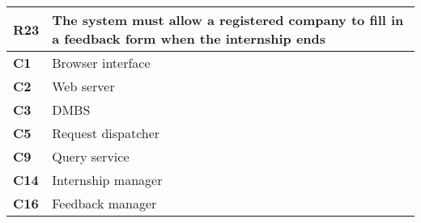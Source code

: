 \begin{table}[H]
    \centering
    \begin{tabular}{|l|m{10cm}|}
        \hline \textbf{R23} & The system must allow a registered company to fill in a feedback form when the internship ends \\
        \hline \textbf{C1} & Browser interface \\
        \hline \textbf{C2} & Web server \\
        \hline \textbf{C3} & DMBS \\
        \hline \textbf{C5} & Request dispatcher \\
        \hline \textbf{C9} & Query service \\
        \hline \textbf{C14} & Internship manager \\
        \hline \textbf{C16} & Feedback manager \\
        \hline
    \end{tabular}
\end{table}

